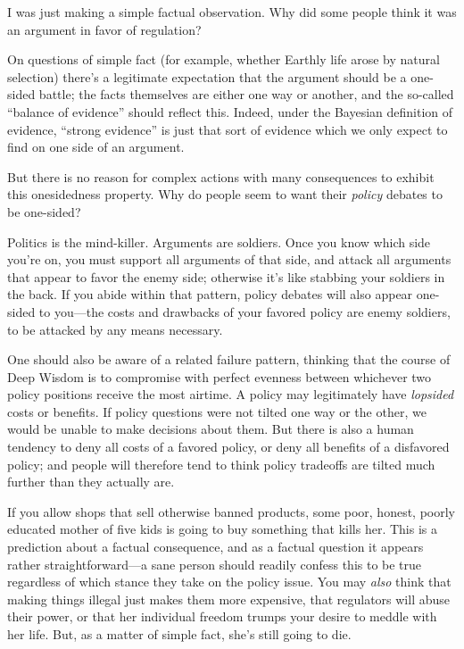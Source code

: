 {
 I was just making a simple factual observation. Why did some
people think it was an argument in favor of regulation?}

{
 On questions of simple fact (for example, whether Earthly life
arose by natural selection) there's a legitimate
expectation that the argument should be a one-sided battle; the facts
themselves are either one way or another, and the so-called
``balance of evidence'' should
reflect this. Indeed, under the Bayesian definition of evidence,
``strong evidence'' is just that
sort of evidence which we only expect to find on one side of an
argument.}

{
 But there is no reason for complex actions with many consequences
to exhibit this onesidedness property. Why do people seem to want their
\textit{policy} debates to be one-sided?}

{
 Politics is the mind-killer. Arguments are soldiers. Once you know
which side you're on, you must support all arguments of
that side, and attack all arguments that appear to favor the enemy
side; otherwise it's like stabbing your soldiers in the
back. If you abide within that pattern, policy debates will also appear
one-sided to you---the costs and drawbacks of your favored policy are
enemy soldiers, to be attacked by any means necessary.}

{
 One should also be aware of a related failure pattern, thinking
that the course of Deep Wisdom is to compromise with perfect evenness
between whichever two policy positions receive the most airtime. A
policy may legitimately have \textit{lopsided} costs or benefits. If
policy questions were not tilted one way or the other, we would be
unable to make decisions about them. But there is also a human tendency
to deny all costs of a favored policy, or deny all benefits of a
disfavored policy; and people will therefore tend to think policy
tradeoffs are tilted much further than they actually are.}

{
 If you allow shops that sell otherwise banned products, some poor,
honest, poorly educated mother of five kids is going to buy something
that kills her. This is a prediction about a factual consequence, and
as a factual question it appears rather straightforward---a sane person
should readily confess this to be true regardless of which stance they
take on the policy issue. You may \textit{also} think that making
things illegal just makes them more expensive, that regulators will
abuse their power, or that her individual freedom trumps your desire to
meddle with her life. But, as a matter of simple fact,
she's still going to die.}

